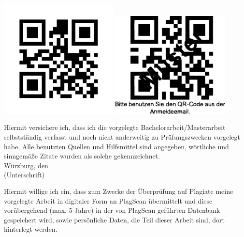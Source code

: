 \documentclass[ngerman,bt]{dbvdoc}
\begin{document}
\clearpage
  \selectlanguage{\ngerman}
  \begin{deckblatt}
  \end{deckblatt}
\clearpage
\mbox{}
\vfill
\begin{center}
\ifpdf
	\includegraphics[width=6cm]{qrcode-thesis.png}
\else
	\includegraphics[width=6cm]{qrcode-thesis.eps}
\fi
\end{center}
\clearpage

\noindent Hiermit versichere ich, dass ich die vorgelegte Bachelorarbeit/Masterarbeit selbstständig verfasst und noch nicht
anderweitig zu Prüfungszwecken vorgelegt habe. Alle benutzten Quellen und Hilfsmittel sind
angegeben, wörtliche und sinngemäße Zitate wurden als solche gekennzeichnet.\\[5mm]
Würzburg, den\\[20mm]
(Unterschrift)

\vfill

\noindent Hiermit willige ich ein, dass zum Zwecke der Überprüfung auf Plagiate meine vorgelegte Arbeit in
digitaler Form an PlagScan übermittelt und diese vorübergehend (max. 5 Jahre)
in der von PlagScan geführten Datenbank gespeichert wird, sowie persönliche Daten, die Teil dieser
Arbeit sind, dort hinterlegt werden.
\end{document}

